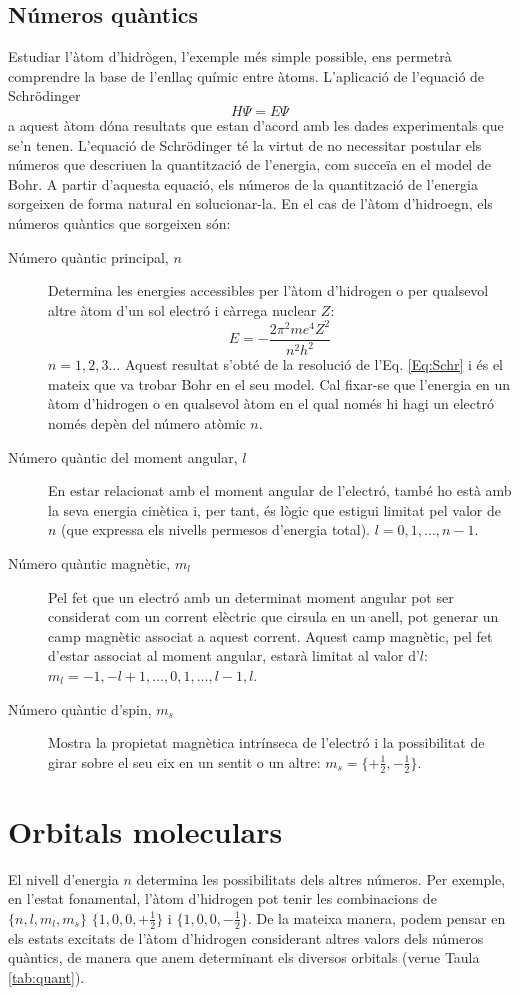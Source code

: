 \subsection{Números quàntics}
Estudiar l'àtom d'hidrògen, l'exemple més simple possible, ens permetrà comprendre la base de l'enllaç químic entre àtoms.
L'aplicació de l'equació de Schrödinger 
\begin{equation}
H\Psi = E\Psi
\label{Eq:Schr}
\end{equation}a aquest àtom dóna resultats que estan d'acord amb les dades experimentals que se'n tenen.
L'equació de Schrödinger té la virtut de no necessitar postular els números que descriuen la quantització de l'energia, com succeïa en el model de Bohr. A partir d'aquesta equació, els números de la quantització de l'energia sorgeixen de forma natural en solucionar-la. En el cas de l'àtom d'hidroegn, els números quàntics que sorgeixen són:
\begin{description}
\item[Número quàntic principal, $n$]  Determina les energies accessibles per l'àtom d'hidrogen o per qualsevol altre àtom d'un sol electró i càrrega nuclear $Z$:
\[
E=-\frac{2\pi^2 me^4 Z^2}{n^2 h^2}
\]
$n=1,2,3\ldots$
Aquest resultat s'obté de la resolució de l'Eq. \ref{Eq:Schr} i és el mateix que va trobar Bohr en el seu model.
Cal fixar-se que l'energia en un àtom d'hidrogen o en qualsevol àtom en el qual només hi hagi un electró només depèn del número atòmic $n$.
\item[Número quàntic del moment angular, $l$] En estar relacionat amb el moment angular de l'electró, també ho està amb la seva energia cinètica i, per tant, és lògic que estigui limitat pel valor de $n$ (que expressa els nivells permesos d'energia total). $l=0, 1, \ldots, n-1$.
\item[Número quàntic magnètic, $m_l$] Pel fet que un electró amb un determinat moment angular pot ser considerat com un corrent elèctric que cirsula en un anell, pot generar un camp magnètic associat a aquest corrent. Aquest camp magnètic, pel fet d'estar associat al moment angular, estarà limitat al valor d'$l$: $m_l=-1, -l+1, \ldots, 0, 1, \ldots, l-1,l$.
\item[Número quàntic d'spin, $m_s$] Mostra la propietat magnètica intrínseca de l'electró i la possibilitat de girar sobre el seu eix en un sentit o un altre: $m_s=\{+\frac{1}{2},-\frac{1}{2}\}$.
\end{description}

\section{Orbitals moleculars}
El nivell d'energia $n$ determina les possibilitats dels altres números. Per exemple, en l'estat fonamental, l'àtom d'hidrogen pot tenir les combinacions de $\{n,l,m_l,m_s\}$ $\{1,0,0,+\frac{1}{2}\}$ i $\{1,0,0,-\frac{1}{2}\}$. De la mateixa manera, podem pensar en els estats excitats de l'àtom d'hidrogen considerant altres valors dels números quàntics, de manera que anem determinant els diversos orbitals (verue Taula \ref{tab:quant}).

